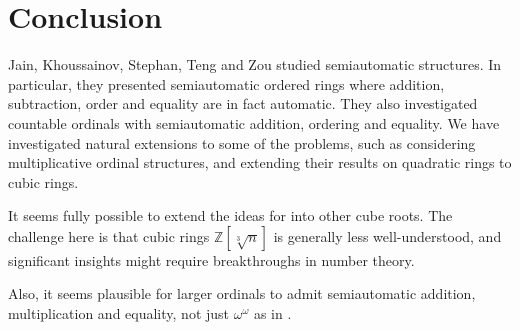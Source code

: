\documentclass[british,a4paper,11pt,abstract=on]{scrreprt}
\theoremstyle{definition}
\theoremstyle{remark}
\newcommand{\Z}{\mathbb{Z}}
\newcommand{\cbrt}[1]{\sqrt[3]{#1}}
\begin{document}

\chapter{Conclusion}

Jain, Khoussainov, Stephan, Teng and Zou \autocite{semiauto} studied semiautomatic structures.
In particular, they presented semiautomatic ordered rings where addition, subtraction, order and equality are in fact automatic.
They also investigated countable ordinals with semiautomatic addition, ordering and equality.
We have investigated natural extensions to some of the problems, such as considering multiplicative ordinal structures,
and extending their results on quadratic rings to cubic rings.

It seems fully possible to extend the ideas for  into other cube roots.
The challenge here is that cubic rings \(\Z[\cbrt{n}]\) is generally less well-understood,
and significant insights might require breakthroughs in number theory.

Also, it seems plausible for larger ordinals to admit semiautomatic addition, multiplication and equality, not just \(\omega^\omega\) as in .


\printbibliography[heading=bibintoc,title={References}]
\end{document}
